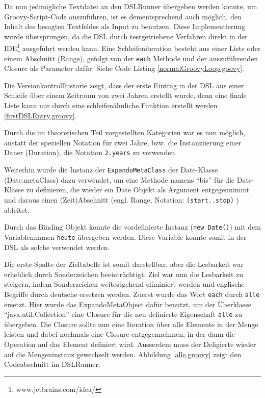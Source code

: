 \documentclass[11pt,english,ngerman, headsepline]{scrreprt}
\begin{document}
Da nun jedmögliche Textdatei an den DSLRunner übergeben werden konnte, um
Groovy-Script-Code auszuführen, ist es dementsprechend auch möglich, den Inhalt
des besagten Textfeldes als Input zu benutzen. Diese Implementierung
wurde übersprungen, da die DSL durch testgetriebene Verfahren
\cite{beck2002driven} direkt in der IDE\footnote{www.jetbrains.com/idea/ }
ausgeführt werden kann.
 Eine Schleifeniteration besteht aus einer Liste oder
einem Abschnitt (Range), gefolgt von der \texttt{each} Methode und der
auszuführenden Closure als Parameter dafür. Siehe Code Listing \ref{normalGroovyLoop.goovy}. 



Die Versionkontrollhistorie zeigt, dass der erste Eintrag in der DSL aus einer
Schleife über einem Zeitraum von zwei Jahren erstellt wurde, denn eine finale
Liste kann nur durch eine schleifenähnliche Funktion erstellt werden
\ref{firstDSLEntry.groovy}.



Durch die im theoretischen Teil vorgestellten Kategorien war es nun möglich,
anstatt der speziellen Notation für zwei Jahre, bzw. die Instanziierung einer
Dauer (Duration), die Notation \texttt{2.years} zu verwenden. 

Weiterhin wurde die Instanz
der \texttt{ExpandoMetaClass} der Date-Klasse (Date.metaClass) dazu verwendet,
um eine Methode namens ``bis'' für die Date-Klasse zu definieren, die wieder ein Date
Objekt als Argument entgegennimmt und daraus einen (Zeit)Abschnitt (engl.
Range, Notation: \texttt{(start..stop)}  ) ableitet.

Durch das Binding Objekt konnte die vordefinierte Instanz (\texttt{new Date()}) mit dem
Variablennamen \texttt{heute} übergeben werden. Diese Variable konnte somit in
der DSL als solche verwendet werden. 

Die erste Spalte der Zieltabelle ist somit darstellbar, aber die Lesbarkeit war
erheblich durch Sonderzeichen beeinträchtigt. Ziel war nun die Lesbarkeit zu steigern, indem Sonderzeichen weitestgehend eliminiert werden und
englische Begriffe durch deutsche ersetzen werden.
Zuerst wurde das Wort \texttt{each} durch \texttt{alle} ersetzt. Hier wurde das
ExpandoMetaObject dafür benutzt, um der Überklasse ``java.util.Collection'' eine
Closure für die neu definierte Eigenschaft \texttt{alle} zu übergeben. Die
Closure sollte nun eine Iteration über alle Elemente in der Menge leisten und dabei
nochmals eine Closure entgegennehmen, in der dann die Operation auf das Element
definiert wird. Ausserdem muss der Deligierte wieder auf die Mengeninstanz
gewechselt werden. Abbildung \ref{alle.groovy} zeigt den Codeabschnitt im
DSLRunner.
\end{document}
